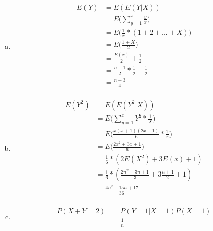 \documentclass[10pt]{report}
\begin{document}
\subsection{}
 \begin{enumerate}[(a)]
 \item \begin{align*}
 E(Y) &= E(E(Y|X)) \\
 &= E\bigg(\sum_{y=1}^{x} \frac{y}{x}\bigg) \\
 &= E \bigg(\frac{1}{x} * (1 + 2 + ... + X) \bigg) \\
 &= E\bigg(\frac{1+X}{2} \bigg) \\
 & =\frac{E(x)}{2} + \frac{1}{2}  \\
 &= \frac{n+1}{2} * \frac{1}{2} + \frac{1}{2}  \\
 & = \frac{n+3}{4} \\
 \end{align*}
 \item \begin{align*}
 E(Y^2) &= E(E(Y^2|X)) \\
 &= E\bigg(\sum_{y=1}^{x} Y^2 *\frac{1}{X} \bigg) \\
 &= E\bigg(\frac{x(x+1)(2x+1)}{6} * \frac{1}{x} \bigg) \\
 &= E\bigg(\frac{2x^2 + 3x + 1}{6} \bigg) \\
 &= \frac{1}{6} *( 2E(X^2) + 3E(x) + 1) \\
 &= \frac{1}{6} * ( \frac{2n^2 + 3n + 1}{3} + 3\frac{n+1}{2} + 1) \\
 &= \frac{4n^2+ 15n + 17}{36} \\
 \end{align*}
 \item \begin{align*}
 P(X+Y=2) &= P(Y=1|X=1) P(X=1) \\
 &= \frac{1}{n}
 \end{align*}
 \end{enumerate}
\end{document}

